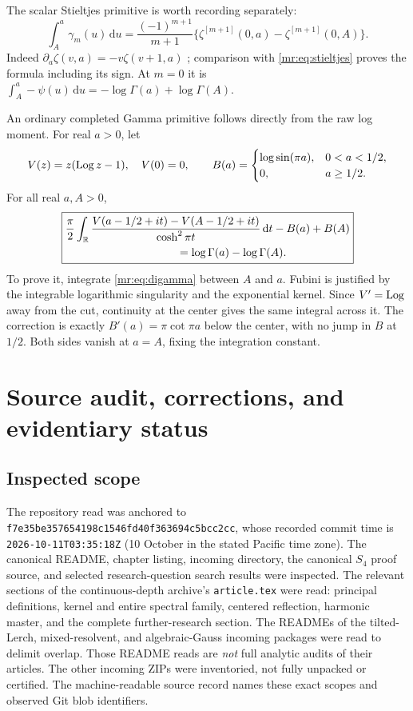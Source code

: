 \documentclass[11pt,letterpaper]{article}
\theoremstyle{definition}\newtheorem{definition}[theorem]{Definition}
\theoremstyle{remark}\newtheorem{remark}[theorem]{Remark}
\newcommand{\dd}{\,\mathrm d}\newcommand{\M}{\mathcal M}
\newcommand{\src}[1]{\nolinkurl{#1}}
\newcommand{\pin}{\src{f7e35be357654198c1546fd40f363694c5bcc2cc}}
\begin{document}
The scalar Stieltjes primitive is worth recording separately:
\begin{equation}\label{mr:eq:stieltjesprimitive}
 \int_A^a\gamma_m(u)\dd u
 =\frac{(-1)^{m+1}}{m+1}
   \{\zeta^{[m+1]}(0,a)-\zeta^{[m+1]}(0,A)\}.
\end{equation}
Indeed $\partial_a\zeta(v,a)=-v\zeta(v+1,a)$ \cite{Zeta};
comparison with \eqref{mr:eq:stieltjes} proves the formula including
its sign. At $m=0$ it is
$\int_A^a-\psi(u)\dd u=-\log\Gamma(a)+\log\Gamma(A)$.

An ordinary completed Gamma primitive follows directly from the raw
log moment. For real $a>0$, let
\begin{equation}\label{mr:eq:VB}
 V(z)=z(\operatorname{Log} z-1),\quad V(0)=0,\qquad
 B(a)=\begin{cases}\log\sin(\pi a),&0<a<1/2,\\0,&a\ge1/2.\end{cases}
\end{equation}
For all real $a,A>0$,
\begin{equation}\label{mr:eq:gammaprimitive}
 \boxed{\begin{aligned}
 &\frac\pi2\int_\R\frac{
        V(a-1/2+it)-V(A-1/2+it)}{\cosh^2\pi t}\dd t
       -B(a)+B(A)\\
 &\hspace{35mm}=\log\Gamma(a)-\log\Gamma(A).
 \end{aligned}}
\end{equation}
To prove it, integrate \eqref{mr:eq:digamma} between $A$ and $a$.
Fubini is justified by the integrable logarithmic singularity and the
exponential kernel. Since $V'=\operatorname{Log}$ away from the cut, continuity at
the center gives the same integral across it. The correction is exactly
$B'(a)=\pi\cot\pi a$ below the center, with no jump in $B$ at $1/2$.
Both sides vanish at $a=A$, fixing the integration constant.

\section{Source audit, corrections, and evidentiary status}
\label{mr:sec:audit}
\subsection{Inspected scope}
The repository read was anchored to \pin, whose recorded commit time is
\src{2026-10-11T03:35:18Z} (10 October in the stated Pacific time zone).
The canonical README, chapter listing, incoming directory, the canonical
$S_4$ proof source, and selected research-question search results were
inspected. The relevant sections of the continuous-depth archive's
\src{article.tex} were read: principal definitions, kernel and entire
spectral family, centered reflection, harmonic master, and the complete
further-research section. The READMEs of the tilted-Lerch, mixed-resolvent,
and algebraic-Gauss incoming packages were read to delimit overlap.
Those README reads are \emph{not} full analytic audits of their articles.
The other incoming ZIPs were inventoried, not fully unpacked or certified.
The machine-readable source record names these exact scopes and observed
Git blob identifiers.
\end{document}
